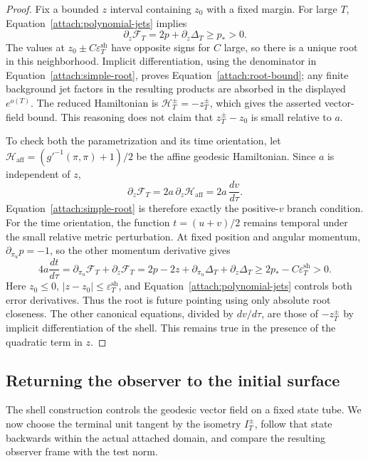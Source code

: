 \begin{proof}
Fix a bounded $z$ interval containing $z_0$ with a fixed margin.
For large $T$, Equation~\eqref{attach:polynomial-jets} implies
\begin{equation}\label{attach:simple-root}
 \partial_z\mathcal F_T=2p+\partial_z\Delta_T\ge p_*>0.
\end{equation}
The values at $z_0\pm C\varepsilon_T^{\mathrm{sh}}$ have opposite signs for $C$ large,
so there is a unique root in this neighborhood. Implicit
differentiation, using the denominator in
Equation~\eqref{attach:simple-root}, proves
Equation~\eqref{attach:root-bound}; any finite background jet factors
in the resulting products are absorbed in the displayed $e^{o(T)}$.
The reduced Hamiltonian is $\mathcal H_T^\pm=-z_T^\pm$, which gives
the asserted vector-field bound. This reasoning does not claim that
$z_T^\pm-z_0$ is small relative to $a$.

To check both the parametrization and its time orientation, let
$\mathcal H_{\mathrm{aff}}=(g'^{-1}(\pi,\pi)+1)/2$ be the affine geodesic
Hamiltonian. Since $a$ is independent of $z$,
\begin{equation}\label{attach:future-root}
 \partial_z\mathcal F_T
   =2a\,\partial_z\mathcal H_{\mathrm{aff}}
   =2a\,\frac{dv}{d\tau}.
\end{equation}
Equation~\eqref{attach:simple-root} is therefore exactly the
positive-$v$ branch condition. For the time orientation, the
function $t=(u+v)/2$ remains temporal under the small relative
metric perturbation. At fixed position and angular momentum,
$\partial_{\pi_u}p=-1$, so the other momentum derivative gives
\[
 4a\frac{dt}{d\tau}
 =\partial_{\pi_u}\mathcal F_T+\partial_z\mathcal F_T
 =2p-2z+\partial_{\pi_u}\Delta_T+\partial_z\Delta_T
 \ge 2p_*-C\varepsilon_T^{\mathrm{sh}}>0.
\]
Here $z_0\le0$, $|z-z_0|\le\varepsilon_T^{\mathrm{sh}}$, and
Equation~\eqref{attach:polynomial-jets} controls both error
derivatives. Thus the root is future pointing using only absolute
root closeness. The other canonical equations,
divided by $dv/d\tau$, are those of $-z_T^\pm$ by implicit
differentiation of the shell. This remains true in the presence of
the quadratic term in $z$.
\end{proof}

\subsection{Returning the observer to the initial surface}

The shell construction controls the geodesic vector field on a fixed
state tube. We now choose the terminal unit tangent by the isometry
$I_T^\pm$, follow that state backwards within the actual attached
domain, and compare the resulting observer frame with the test norm.

